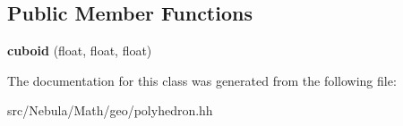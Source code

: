 \subsection*{\-Public \-Member \-Functions}
\begin{DoxyCompactItemize}
\item 
\hypertarget{classmath_1_1geo_1_1cuboid_a72bd7e6bf32ccd6928e375efa3036491}{{\bfseries cuboid} (float, float, float)}\label{classmath_1_1geo_1_1cuboid_a72bd7e6bf32ccd6928e375efa3036491}

\end{DoxyCompactItemize}


\-The documentation for this class was generated from the following file\-:\begin{DoxyCompactItemize}
\item 
src/\-Nebula/\-Math/geo/polyhedron.\-hh\end{DoxyCompactItemize}
